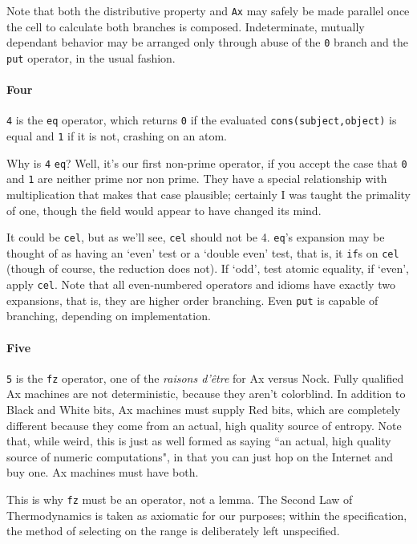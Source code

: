 \documentclass[twoside]{article}
\begin{document}
Note that both the distributive property and \texttt{Ax} may safely be made parallel once the cell to calculate both branches is composed. Indeterminate, mutually dependant behavior may be arranged only through abuse of the \texttt{0} branch and the \texttt{put} operator, in the usual fashion. 

\paragraph{Four}

\texttt{4} is the \texttt{eq} operator, which returns \texttt{0} if the evaluated \texttt{cons(subject,object)} is equal and \texttt{1} if it is not, crashing on an atom.

Why is \texttt{4} \texttt{eq}? Well, it's our first non-prime operator, if you accept the case that \texttt{0} and \texttt{1} are neither prime nor non prime. They have a special relationship with multiplication that makes that case plausible; certainly I was taught the primality of one, though the field would appear to have changed its mind. 

It could be \texttt{cel}, but as we'll see, \texttt{cel} should not be 4. \texttt{eq}'s expansion may be thought of as having an `even' test or a `double even' test, that is, it \texttt{if}s on \texttt{cel} (though of course, the reduction does not). If `odd', test atomic equality, if `even', apply \texttt{cel}. 
Note that all even-numbered operators and idioms have exactly two expansions, that is, they are higher order branching. Even \texttt{put} is capable of branching, depending on implementation.

\paragraph{Five}

\texttt{5} is the \texttt{fz} operator, one of the \emph{raisons d'être} for Ax versus Nock.  %
Fully qualified Ax machines are not deterministic, because they aren't colorblind. In addition to Black and White bits, Ax machines must supply Red bits, which are completely different because they come from an actual, high quality source of entropy. Note that, while weird, this is just as well formed as saying ``an actual, high quality source of numeric computations", in that you can just hop on the Internet and buy one. Ax machines must have both.

This is why \texttt{fz} must be an operator, not a lemma. The Second Law of Thermodynamics is taken as axiomatic for our purposes; within the specification, the method of selecting on the range is deliberately left unspecified.
\end{document}
